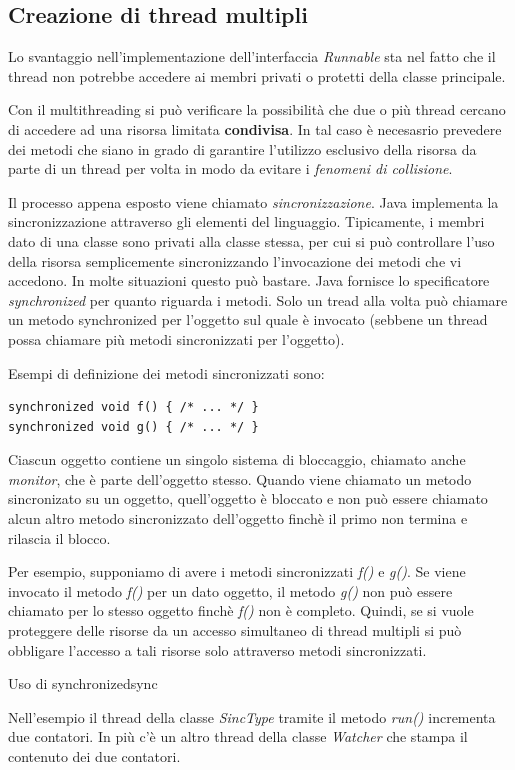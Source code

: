 \documentclass[12pt]{report}
\newcommand{\nmu}{}
\begin{document}
\subsection{Creazione di thread multipli}
Lo svantaggio nell'implementazione dell'interfaccia \textit{Runnable} sta nel fatto che il thread non potrebbe accedere ai membri privati o protetti della classe principale.
\begin{example}{}{}

\end{example}
Con il multithreading si può verificare la possibilità che due o più thread cercano di accedere ad una risorsa limitata \textbf{condivisa}. In tal caso è necesasrio prevedere dei metodi che siano in grado di garantire l'utilizzo esclusivo della risorsa da parte di un thread per volta in modo da evitare i \textit{fenomeni di collisione}.

Il processo appena esposto viene chiamato \textit{sincronizzazione}. Java implementa la sincronizzazione attraverso gli elementi del linguaggio. Tipicamente, i membri dato di una classe sono privati alla classe stessa, per cui si può controllare l'uso della risorsa semplicemente sincronizzando l'invocazione dei metodi che vi accedono. In molte situazioni questo può bastare. Java fornisce lo specificatore \textit{synchronized} per quanto riguarda i metodi. Solo un tread alla volta può chiamare un metodo synchronized per l'oggetto sul quale è invocato (sebbene un thread possa chiamare più metodi sincronizzati per l'oggetto).

Esempi di definizione dei metodi sincronizzati sono:
\begin{lstlisting}[style=javastyle]
synchronized void f() { /* ... */ }
synchronized void g() { /* ... */ }
\end{lstlisting}
Ciascun oggetto contiene un singolo sistema di bloccaggio, chiamato anche \textit{monitor}, che è parte dell'oggetto stesso. Quando viene chiamato un metodo sincronizato su un oggetto, quell'oggetto è bloccato e non può essere chiamato alcun altro metodo sincronizzato dell'oggetto finchè il primo non termina e rilascia il blocco.

Per esempio, supponiamo di avere i metodi sincronizzati \textit{f()} e \textit{g()}. Se viene invocato il metodo \textit{f()} per un dato oggetto, il metodo \textit{g()} non può essere chiamato per lo stesso oggetto finchè \textit{f()} non è completo. Quindi, se si vuole proteggere delle risorse da un accesso simultaneo di thread multipli si può obbligare l'accesso a tali risorse solo attraverso metodi sincronizzati.
\begin{example}{\nmu Uso di synchronized}{sync}

\end{example}
Nell'esempio il thread della classe \textit{SincType} tramite il metodo \textit{run()} incrementa due contatori. In più c'è un altro thread della classe \textit{Watcher} che stampa il contenuto dei due contatori.
\end{document}
